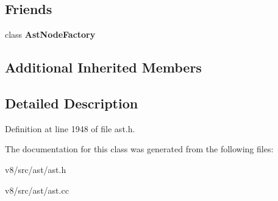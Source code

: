 \subsection*{Friends}
\begin{DoxyCompactItemize}
\item 
\mbox{\label{classv8_1_1internal_1_1BinaryOperation_a8d587c8ad3515ff6433eb83c578e795f}} 
class {\bfseries Ast\+Node\+Factory}
\end{DoxyCompactItemize}
\subsection*{Additional Inherited Members}


\subsection{Detailed Description}


Definition at line 1948 of file ast.\+h.



The documentation for this class was generated from the following files\+:\begin{DoxyCompactItemize}
\item 
v8/src/ast/ast.\+h\item 
v8/src/ast/ast.\+cc\end{DoxyCompactItemize}
